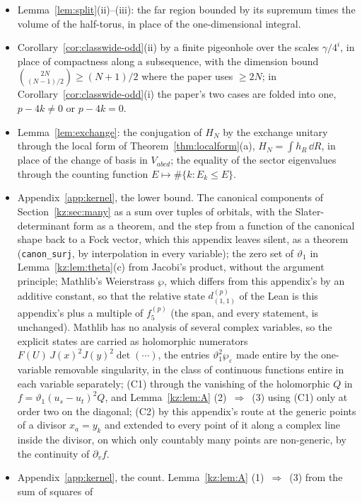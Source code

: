 \begin{itemize}[leftmargin=*]
carry trivial data, so that neither statement acquires a hypothesis this paper's lacks.
\item Lemma~\ref{lem:split}(ii)--(iii): the far region bounded by its supremum times the volume of the half-torus, in place of
the one-dimensional integral.
\item Corollary~\ref{cor:classwide-odd}(ii) by a finite pigeonhole over the scales $\gamma/4^i$, in place of compactness along a
subsequence, with the dimension bound $\binom{2N}{(N-1)/2}\ge(N+1)/2$ where the paper uses $\ge2N$; in
Corollary~\ref{cor:classwide-odd}(i) the paper's two cases are folded into one, $p-4k\ne0$ or $p-4k=0$.
\item Lemma~\ref{lem:exchange}: the conjugation of $H_N$ by the exchange unitary through the local form of
Theorem~\ref{thm:localform}(a), $H_N=\int h_R\,\dd R$, in place of the change of basis in $V_{abcd}$; the equality of the
sector eigenvalues through the counting function $E\mapsto\#\{k:E_k\le E\}$.
\item Appendix~\ref{app:kernel}, the lower bound. The canonical components of Section~\ref{kz:sec:many} as a sum over tuples of
orbitals, with the Slater-determinant form as a theorem, and the step from a function of the canonical shape back to a Fock
vector, which this appendix leaves silent, as a theorem (\texttt{canon\_surj}, by interpolation in every variable); the zero set
of $\vartheta_1$ in Lemma~\ref{kz:lem:theta}(c) from Jacobi's product, without the argument principle; Mathlib's Weierstrass
$\wp$, which differs from this appendix's by an additive constant, so that the relative state $d^{(p)}_{(1,1)}$ of the Lean is
this appendix's plus a multiple of $f_5^{(p)}$ (the span, and every statement, is unchanged). Mathlib has no analysis of several
complex variables, so the explicit states are carried as holomorphic numerators $F(U)\,J(x)^2J(y)^2\det(\cdots)$, the entries
$\vartheta_1^2\wp_\varepsilon$ made entire by the one-variable removable singularity, in the class of continuous functions
entire in each variable separately; (C1) through the vanishing of the holomorphic $Q$ in $f=\vartheta_1(u_s-u_t)^2Q$, and
Lemma~\ref{kz:lem:A} (2)~$\Rightarrow$~(3) using (C1) only at order two on the diagonal; (C2) by this appendix's route at the
generic points of a divisor $x_a=y_k$ and extended to every point of it along a complex line inside the divisor, on which only
countably many points are non-generic, by the continuity of $\partial_vf$.
\item Appendix~\ref{app:kernel}, the count. Lemma~\ref{kz:lem:A} (1)~$\Rightarrow$~(3) from the sum of squares of

\end{itemize}
